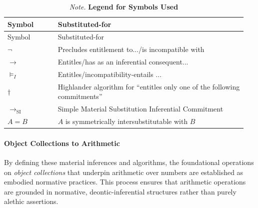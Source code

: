 \documentclass[12pt]{book}
\begin{document}
\begin{longtable}[]{@{}
  >{\raggedright\arraybackslash}p{0.2\linewidth}
  >{\raggedright\arraybackslash}p{0.75\linewidth}@{}}
\caption{\textit{Note. }\textbf{Legend for Symbols Used}}\tabularnewline
\toprule\noalign{}
Symbol & Substituted-for \\
\midrule
\endfirsthead
\toprule\noalign{}
Symbol & Substituted-for \\
\midrule
\endhead
\bottomrule
\endlastfoot
\(\neg\) & Precludes entitlement to.../is incompatible with \\
\(\rightarrow\) & Entitles/has as an inferential consequent... \\
\(\vDash_{I}\) & Entitles/incompatibility-entails ... \\
\(\dagger\) & Highlander algorithm for ``entitles only one of the following commitments'' \\
\(\rightarrow_{\text{SI}}\) & Simple Material Substitution Inferential Commitment \\
\(A = B\) & \(A\) is symmetrically intersubstitutable with \(B\) \\
\end{longtable}

\paragraph{Object Collections to Arithmetic}


By defining these material inferences and algorithms, the foundational operations on \textit{object collections} that underpin arithmetic over numbers are established as embodied normative practices. This process ensures that arithmetic operations are grounded in normative, deontic-inferential structures rather than purely alethic assertions.
\end{document}
